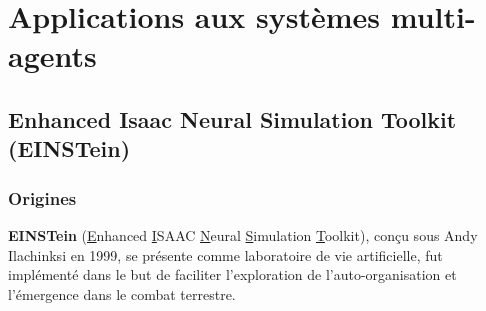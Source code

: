 \documentclass{article}
\begin{document}
\section{Applications aux systèmes multi-agents}

\subsection{Enhanced Isaac Neural Simulation Toolkit (EINSTein)}

\subsubsection{Origines}
\textbf{EINSTein} (\underline{E}nhanced \underline{I}SAAC \underline{N}eural \underline{S}imulation \underline{T}oolkit), conçu sous Andy Ilachinksi en 1999, se présente comme \og{}laboratoire\fg{} de vie artificielle, fut implémenté dans le but de faciliter l'exploration de l'auto-organisation et l'émergence dans le combat terrestre. 
\end{document}
